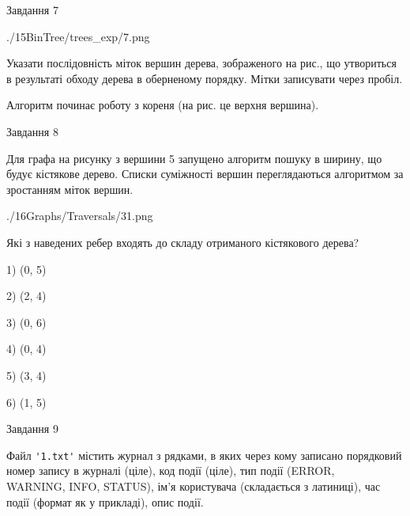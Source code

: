 \documentclass[12pt, ukrainian]{article}
\def\code#1{\Verb!#1!}
\begin{document}
{\newpage
\begin{minipage}[t]{9.7cm}
               
{\begin{center}Завдання {7}\end{center}}
\vspace{-6mm}

\begin{center}
	{./15BinTree/trees_exp/7.png}
\end{center}
Указати послідовність міток вершин дерева, зображеного на рис., що утвориться в результаті обходу дерева в оберненому порядку. Мітки записувати через пробіл.\par Алгоритм починає роботу з кореня (на рис. це верхня вершина).\par

\end{minipage}
\vline \hspace{8mm}
\begin{minipage}[t]{8.0cm}
               
{\begin{center}Завдання {8}\end{center}}
\vspace{-6mm}
Для графа на рисунку з вершини 5 запущено алгоритм пошуку в ширину, що будує кістякове дерево. Списки суміжності вершин переглядаються алгоритмом за зростанням міток вершин.\par
\begin{center}
	{./16Graphs/Traversals/31.png}
\end{center}
\par Які з наведених ребер входять до складу отриманого кістякового дерева?\par
1) (0, 5)\par
2) (2, 4)\par
3) (0, 6)\par
4) (0, 4)\par
5) (3, 4)\par
6) (1, 5)\par
{\vskip 15pt} \par

\end{minipage}

               
{\begin{center}Завдання {9}\end{center}}
\vspace{-6mm}
Файл \code{'1.txt'} містить журнал з рядками, в яких через кому записано поряд\-ко\-вий номер запису в журналі (ціле), код події (ціле), тип події (ERROR, \\WARNING, INFO, STATUS), ім'я користувача (складається з латиниці), час події (фор\-мат як у прикладі), опис події.

}
\end{document}

